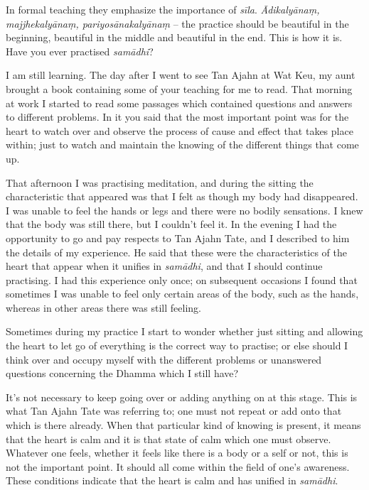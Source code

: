 In formal teaching they emphasize the importance of \emph{sīla}. 
\emph{Ādikalyānaṃ, majjhekalyānaṃ, pariyosānakalyānaṃ} -- the practice should
be beautiful in the beginning, beautiful in the middle and beautiful in
the end. This is how it is. Have you ever practised \emph{samādhi}? 

\bigskip

\noindent
I am still learning. The day after I went to see Tan Ajahn at Wat
Keu, my aunt brought a book containing some of your teaching for me
to read. That morning at work I started to read some passages which
contained questions and answers to different problems. In it you said
that the most important point was for the heart to watch over and
observe the process of cause and effect that takes place within; just to
watch and maintain the knowing of the different things that come up. 

That afternoon I was practising meditation, and during the sitting the
characteristic that appeared was that I felt as though my body had
disappeared. I was unable to feel the hands or legs and there were no
bodily sensations. I knew that the body was still there, but I couldn't
feel it. In the evening I had the opportunity to go and pay respects to
Tan Ajahn Tate, and I described to him the details of my experience. He
said that these were the characteristics of the heart that appear when
it unifies in \emph{samādhi}, and that I should continue practising. I
had this experience only once; on subsequent occasions I found that
sometimes I was unable to feel only certain areas of the body, such as
the hands, whereas in other areas there was still feeling.

\question{}
Sometimes
during my practice I start to wonder whether just sitting and allowing
the heart to let go of everything is the correct way to practise; or
else should I think over and occupy myself with the different problems
or unanswered questions concerning the Dhamma which I still have? 

It's not necessary to keep going over or adding anything
on at this stage. This is what Tan Ajahn Tate was referring to; one must
not repeat or add onto that which is there already. When that particular
kind of knowing is present, it means that the heart is calm and it is
that state of calm which one must observe. Whatever one feels, whether
it feels like there is a body or a self or not, this is not the
important point. It should all come within the field of one's awareness. 
These conditions indicate that the heart is calm and has unified in
\emph{samādhi}. 

